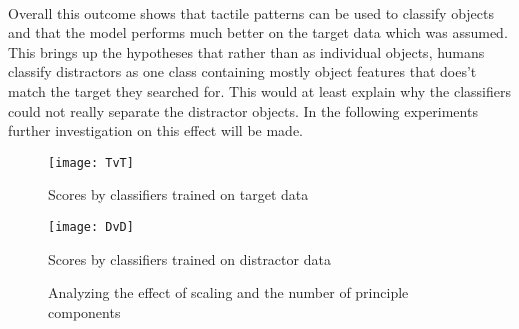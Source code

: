\\ 
Overall this outcome shows that tactile patterns can be used to classify objects and that the model performs much better on the target data which was assumed. This brings up the hypotheses that rather than as individual objects, humans classify distractors as one class containing mostly object features that does't match the target they searched for. This would at least explain why the classifiers could not really separate the distractor objects. In the following experiments further investigation on this effect will be made. 
\begin{figure}[H]\ContinuedFloat
	\centering
	\begin{minipage}{0.7\textwidth}
		\centering
		\texttt{[image: TvT]}
		\caption{Scores by classifiers trained on target data}
		\label{tvt}
	\end{minipage}
	\begin{minipage}{0.7\textwidth}
		\centering
		\texttt{[image: DvD]}
		\caption{Scores by classifiers trained on distractor data}
		\label{dvd}
	\end{minipage}
\end{figure}

\begin{figure}[h]
	\caption{Analyzing the effect of scaling and the number of principle components}
	\label{PCA}
\end{figure}

